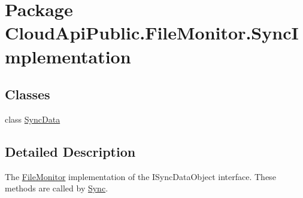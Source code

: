 \hypertarget{namespace_cloud_api_public_1_1_file_monitor_1_1_sync_implementation}{\section{Package Cloud\-Api\-Public.\-File\-Monitor.\-Sync\-Implementation}
\label{namespace_cloud_api_public_1_1_file_monitor_1_1_sync_implementation}
}
\subsection*{Classes}
\begin{DoxyCompactItemize}
\item 
class \hyperlink{class_cloud_api_public_1_1_file_monitor_1_1_sync_implementation_1_1_sync_data}{Sync\-Data}
\end{DoxyCompactItemize}


\subsection{Detailed Description}
The \hyperlink{namespace_cloud_api_public_1_1_file_monitor}{File\-Monitor} implementation of the I\-Sync\-Data\-Object interface. These methods are called by \hyperlink{namespace_cloud_api_public_1_1_sync}{Sync}. 